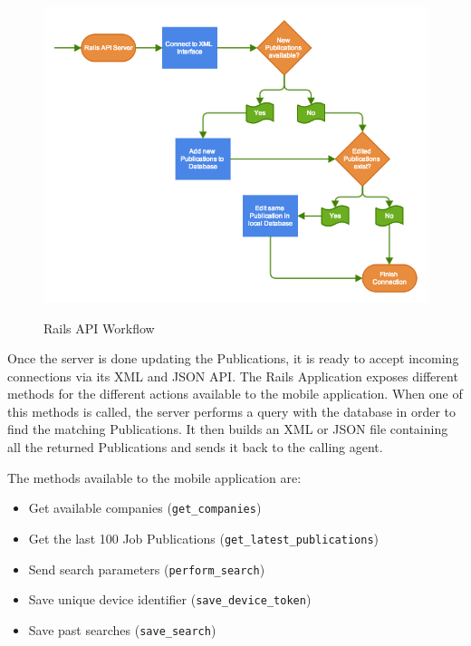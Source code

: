 \begin{figure}[bth]
    \begin{center}
        {\includegraphics[width=1\linewidth]{gfx/api_flow}}
        \caption[Rails API Workflow]{Rails API Workflow}\label{fig:api}
    \end{center}
\end{figure}

Once the server is done updating the Publications, it is ready to accept incoming connections via its \ac{XML} and \ac{JSON} \ac{API}. The Rails Application exposes different methods for the different actions available to the mobile application. When one of this methods is called, the server performs a query with the database in order to find the matching Publications. It then builds an \ac{XML} or \ac{JSON} file containing all the returned Publications and sends it back to the calling agent.\\
\newline

The methods available to the mobile application are:
\begin{itemize}
\item Get available companies (\texttt{get\_companies})
\item Get the last 100 Job Publications (\texttt{get\_latest\_publications})
\item Send search parameters (\texttt{perform\_search})
\item Save unique device identifier (\texttt{save\_device\_token})
\item Save past searches (\texttt{save\_search})
\end{itemize}

